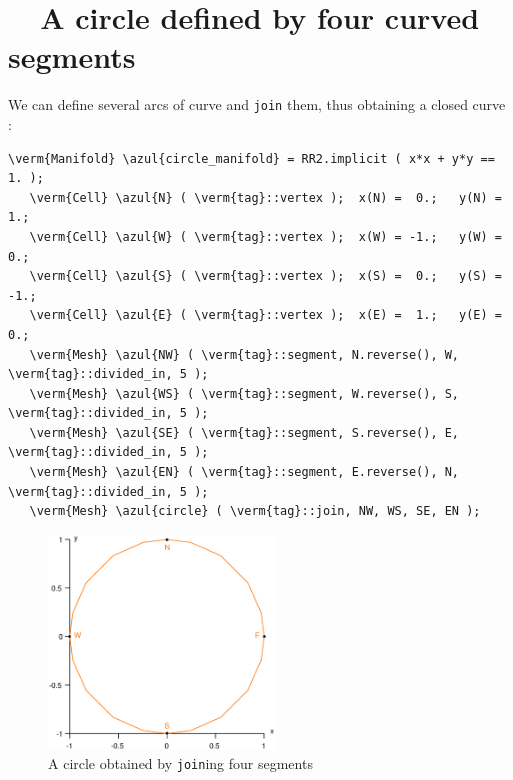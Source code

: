 \section{~~A circle defined by four curved segments}\label{\numb section 2.\numb parag 4}

We can define several arcs of curve and {\small\tt join} them, thus obtaining a closed curve :
\medskip

\begin{Verbatim}[commandchars=\\\{\},formatcom=\small\tt,frame=single,
   label=parag-\ref{\numb section 2.\numb parag 4}.cpp,rulecolor=\color{coment},
   baselinestretch=0.94,framesep=2mm]
   \verm{Manifold} \azul{circle_manifold} = RR2.implicit ( x*x + y*y == 1. );
   \verm{Cell} \azul{N} ( \verm{tag}::vertex );  x(N) =  0.;   y(N) =  1.;
   \verm{Cell} \azul{W} ( \verm{tag}::vertex );  x(W) = -1.;   y(W) =  0.;
   \verm{Cell} \azul{S} ( \verm{tag}::vertex );  x(S) =  0.;   y(S) = -1.;
   \verm{Cell} \azul{E} ( \verm{tag}::vertex );  x(E) =  1.;   y(E) =  0.;
   \verm{Mesh} \azul{NW} ( \verm{tag}::segment, N.reverse(), W, \verm{tag}::divided_in, 5 );
   \verm{Mesh} \azul{WS} ( \verm{tag}::segment, W.reverse(), S, \verm{tag}::divided_in, 5 );
   \verm{Mesh} \azul{SE} ( \verm{tag}::segment, S.reverse(), E, \verm{tag}::divided_in, 5 );
   \verm{Mesh} \azul{EN} ( \verm{tag}::segment, E.reverse(), N, \verm{tag}::divided_in, 5 );
   \verm{Mesh} \azul{circle} ( \verm{tag}::join, NW, WS, SE, EN );
\end{Verbatim}

\begin{figure} \centering
  \includegraphics[width=60mm]{circle}
  \caption{A circle obtained by {\small\tt join}ing four segments}
  \label{\numb section 2.\numb fig 4}
\end{figure}

